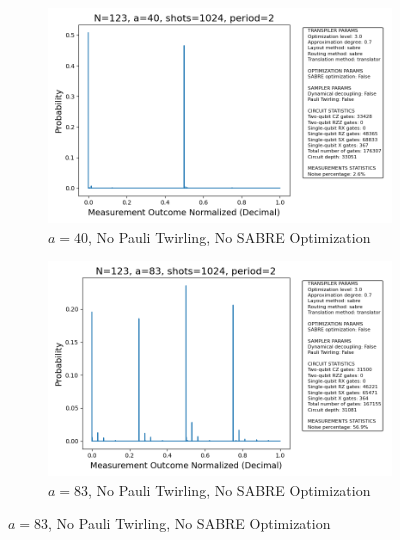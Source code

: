 \documentclass[conference,twoside]{IEEEtran}
\begin{document}
\begin{figure}[!htbp]
    \begin{subfigure}{0.37\textwidth}
        \centering
        \includegraphics[width=\textwidth]{prob_dist_N123_a40_backend_ibmqpu_PT0_SO0.png}
        \caption{$a=40$, No Pauli Twirling, No SABRE Optimization}
    \end{subfigure}
    \hfill
    \begin{subfigure}{0.37\textwidth}
        \centering
        \includegraphics[width=\textwidth]{prob_dist_N123_a83_backend_ibmqpu_PT0_SO0.png}
        \caption{$a=83$, No Pauli Twirling, No SABRE Optimization}
    \end{subfigure}

    \vspace{0pt}


\end{figure}
\end{document}
